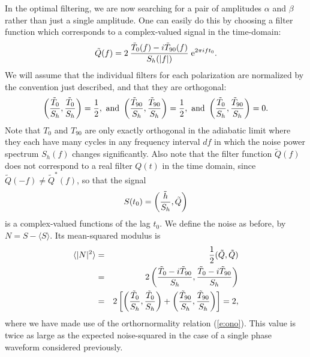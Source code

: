 In the optimal filtering, we are now searching for a pair of amplitudes
$\alpha$ and $\beta$ rather than just a single amplitude.  One can easily do
this by choosing a filter function which corresponds to a complex-valued signal
in the time-domain:
\begin{equation}
\tilde Q(f) =   2 \>
{\tilde T_{0}(f) - i \tilde T_{90}(f) \over S_h(|f|)} \; {\rm e}^{2 \pi i f t_0}.
\end{equation}
We will assume that the individual filters for each polarization are
normalized by the convention just described, and that they are orthogonal:
\begin{equation}
\label{e:ono}
\left( {\tilde T_{0} \over S_h} , {\tilde T_{0} \over S_h} \right) = 
\frac{1}{2}, {\rm \ and\ }
\left( {\tilde T_{90} \over S_h} , {\tilde T_{90} \over S_h} \right) = 
\frac{1}{2}, {\rm \ and\ }
\left( {\tilde T_{0} \over S_h} , {\tilde T_{90} \over S_h} \right) = 0.
\end{equation}
Note that $T_{0}$ and $T_{90}$ are only exactly orthogonal in the
adiabatic limit where they each have many cycles in any frequency
interval $df$ in which the noise power spectrum $S_h(f)$ changes
significantly.  Also note that the filter function $\tilde Q(f)$ does
not correspond to a real filter $Q(t)$ in the time domain, since
$\tilde Q(-f) \ne \tilde Q^*(f)$, so that the signal
\begin{equation}
\label{e:complexsig}
S(t_0) = \left( {  \tilde h \over S_h}, \tilde Q \right)
\end{equation}
is a complex-valued functions of the lag $t_0$.  We define the noise as
before, by $N= S - \langle S \rangle$.  Its mean-squared modulus is
\begin{eqnarray}
\nonumber
\langle | N | ^2 \rangle &=& {1 \over 2} (\tilde Q,\tilde Q) \\
\nonumber
& = & 2 \left( {\tilde T_{0} -i \tilde T_{90} \over S_h} ,  
{\tilde T_{0} -i \tilde T_{90} \over S_h} \right) \\
& = & 2 \left[ \left( 
{\tilde T_{0} \over S_h} , {\tilde T_{0}  \over S_h} \right) +
\left( {\tilde T_{90}   \over S_h} , {\tilde T_{90}  \over S_h} \right) \right] = 2,
\end{eqnarray}
where we have made use of the orthornormality relation (\ref{e:ono}).
This value is twice as large as the expected noise-squared in the case of a single
phase waveform considered previously.

